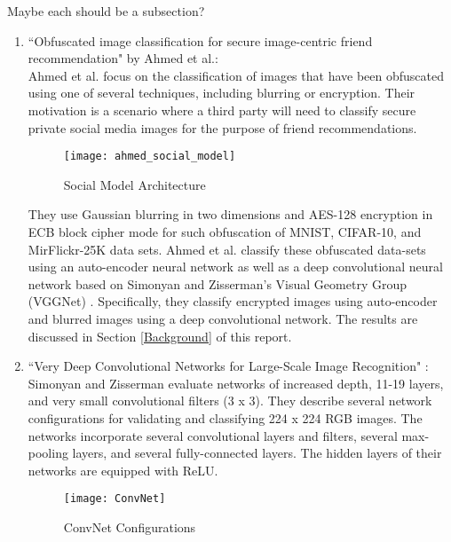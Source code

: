 \documentclass[12pt, titlepage]{article}
\begin{document}
Maybe each should be a subsection?
\begin{enumerate}
	\item ``Obfuscated image classification for secure image-centric friend recommendation" by Ahmed et al.\citep{ahmed2018obfuscated}:\\
	
	Ahmed et al. focus on the classification of images that have been obfuscated using one of several techniques, including blurring or encryption. Their motivation is a scenario where a third party will need to classify secure private social media images for the purpose of friend recommendations. 
	
	\begin{figure}[h!]
		\begin{center}
			\texttt{[image: ahmed\_social\_model]}
			\caption{Social Model Architecture}
			\label{Ahmed_social_model}
		\end{center}
	\end{figure}
	
	
	They use Gaussian blurring in two dimensions and AES-128 encryption in ECB block cipher mode for such obfuscation of MNIST, CIFAR-10, and MirFlickr-25K data sets. Ahmed et al. classify these obfuscated data-sets using an auto-encoder neural network as well as a deep convolutional neural network based on Simonyan and Zisserman's Visual Geometry Group (VGGNet) \cite{simonyan2014very}. Specifically, they classify encrypted images using auto-encoder and blurred images using a deep convolutional network. 
	The results are discussed in Section \ref{Background} of this report. \\
	
	\item ``Very Deep Convolutional Networks for Large-Scale Image Recognition"
	\citep{simonyan2014very}:
	Simonyan and Zisserman evaluate networks of increased depth, 11-19 layers, and very small convolutional filters (3 x 3). They describe several network configurations for validating and classifying 224 x 224 RGB images. The networks incorporate several convolutional layers and filters, several max-pooling layers, and several fully-connected layers. The hidden layers of their networks are equipped with ReLU.
	
	\begin{figure}[h!]
		\begin{center}
			\texttt{[image: ConvNet]}
			\caption{ConvNet Configurations}
			\label{ConvNet}
		\end{center}
	\end{figure}
	

\end{enumerate}
\end{document}
